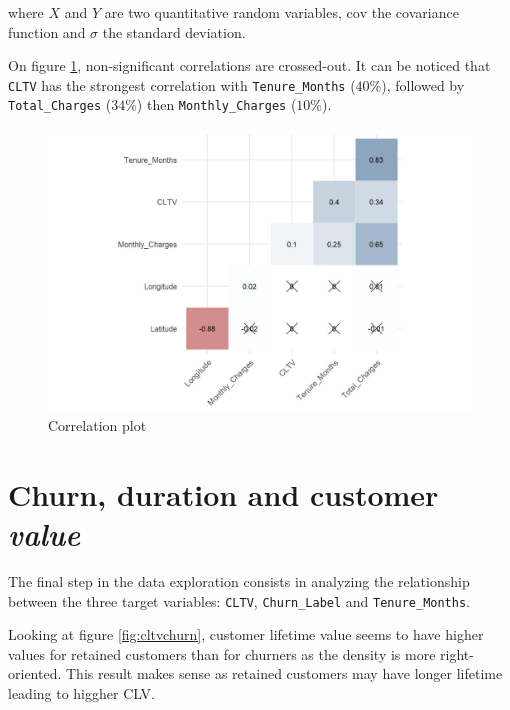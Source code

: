 \documentclass[
]{book}
\begin{document}
where \(X\) and \(Y\) are two quantitative random variables, \(\text{cov}\) the covariance function and \(\sigma\) the standard deviation.

On figure \ref{fig:corrplot}, non-significant correlations are crossed-out. It can be noticed that \texttt{CLTV} has the strongest correlation with \texttt{Tenure\_Months} (\(40\%\)), followed by \texttt{Total\_Charges} (\(34\%\)) then \texttt{Monthly\_Charges} (\(10\%\)).

\begin{figure}

{\centering \includegraphics[width=25in]{./imgs/corr_plot} 

}

\caption{Correlation plot}\label{fig:corrplot}
\end{figure}

\hypertarget{churn-duration-and-customer-value}{%
\section{\texorpdfstring{Churn, duration and customer \emph{value}}{Churn, duration and customer value}}\label{churn-duration-and-customer-value}}

The final step in the data exploration consists in analyzing the relationship between the three target variables: \texttt{CLTV}, \texttt{Churn\_Label} and \texttt{Tenure\_Months}.

Looking at figure \ref{fig:cltvchurn}, customer lifetime value seems to have higher values for retained customers than for churners as the density is more right-oriented. This result makes sense as retained customers may have longer lifetime leading to higgher CLV.
\end{document}
